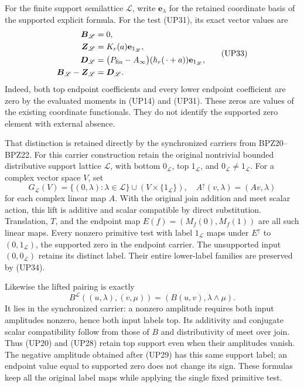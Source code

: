 \documentclass[
  10pt,
  a4paper,
]{article}
\begin{document}
For the finite support semilattice \(\mathscr L\), write
\(\mathbf e_\lambda\) for the retained coordinate basis of the supported
explicit formula. For the test (UP31), its exact vector values are \[
\begin{split}
\boldsymbol B_{\mathscr L}&=0,\\
\boldsymbol Z_{\mathscr L}&=K_r(a)\mathbf e_{1_{\mathscr L}},\\
\boldsymbol D_{\mathscr L}
&=\bigl(P_{\rm fin}-A_\infty\bigr)(h_r(\,\cdot+a))
\mathbf e_{1_{\mathscr L}},\\
\boldsymbol B_{\mathscr L}-\boldsymbol Z_{\mathscr L}
&=\boldsymbol D_{\mathscr L}.
\end{split}
\tag{UP33}
\] Indeed, both top endpoint coefficients and every lower endpoint
coefficient are zero by the evaluated moments in (UP14) and (UP31).
These zeros are values of the existing coordinate functionals. They do
not identify the supported zero element with external absence.

That distinction is retained directly by the synchronized carriers from
BPZ20--BPZ22. For this carrier construction retain the original
nontrivial bounded distributive support lattice \(\mathscr L\), with
bottom \(0_{\mathscr L}\), top \(1_{\mathscr L}\), and
\(0_{\mathscr L}\ne1_{\mathscr L}\). For a complex vector space \(V\),
set \[
G_{\mathscr L}(V)
=\{(0,\lambda):\lambda\in\mathscr L\}
\cup(V\times\{1_{\mathscr L}\}),
\quad A^\uparrow(v,\lambda)=(Av,\lambda)
\tag{UP34}
\] for each complex linear map \(A\). With the original join addition
and meet scalar action, this lift is additive and scalar compatible by
direct substitution. Translation, \(T\), and the endpoint map
\(E(f)=(M_f(0),M_f(1))\) are all such linear maps. Every nonzero
primitive test with label \(1_{\mathscr L}\) maps under \(E^\uparrow\)
to \((0,1_{\mathscr L})\), the supported zero in the endpoint carrier.
The unsupported input \((0,0_{\mathscr L})\) retains its distinct label.
Their entire lower-label families are preserved by (UP34).

Likewise the lifted pairing is exactly \[
B^{\mathscr L}((u,\lambda),(v,\mu))
=(B(u,v),\lambda\wedge\mu).
\tag{UP35}
\] It lies in the synchronized carrier: a nonzero amplitude requires
both input amplitudes nonzero, hence both input labels top. Its
additivity and conjugate scalar compatibility follow from those of \(B\)
and distributivity of meet over join. Thus (UP20) and (UP28) retain top
support even when their amplitudes vanish. The negative amplitude
obtained after (UP29) has this same support label; an endpoint value
equal to supported zero does not change its sign. These formulas keep
all the original label maps while applying the single fixed primitive
test.
\end{document}
